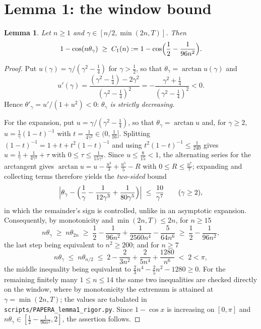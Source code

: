 \documentclass[11pt]{article}
\newtheorem{lemma}[theorem]{Lemma}
\theoremstyle{remark}
\begin{document}
\section{Lemma 1: the window bound}
\begin{lemma}\label{lem:window}
Let $n\ge1$ and $\gamma\in[n/2,\min(2n,T)]$. Then
\begin{equation}\label{eq:C1}
  1-\cos(n\theta_\gamma)\;\ge\;C_1(n):=1-\cos\Bigl(\frac12-\frac{1}{96n^{2}}\Bigr).
\end{equation}
\end{lemma}
\begin{proof}
Put $u(\gamma)=\gamma/(\gamma^{2}-\tfrac14)$ for $\gamma>\tfrac12$, so that
$\theta_\gamma=\arctan u(\gamma)$ and
\[
  u'(\gamma)=\frac{(\gamma^{2}-\tfrac14)-2\gamma^{2}}{(\gamma^{2}-\tfrac14)^{2}}
          =-\frac{\gamma^{2}+\tfrac14}{(\gamma^{2}-\tfrac14)^{2}}<0 .
\]
Hence $\theta'_\gamma=u'/(1+u^{2})<0$: \emph{$\theta_\gamma$ is strictly decreasing}.

For the expansion, put $u=\gamma/(\gamma^{2}-\tfrac14)$, so that $\theta_\gamma=\arctan u$ and, for
$\gamma\ge2$, $u=\frac1\gamma(1-t)^{-1}$ with $t=\frac1{4\gamma^{2}}\in(0,\frac1{16}]$. Splitting
$(1-t)^{-1}=1+t+t^{2}(1-t)^{-1}$ and using $t^{2}(1-t)^{-1}\le\frac1{240}$ gives
$u=\frac1\gamma+\frac1{4\gamma^{3}}+\tau$ with $0\le\tau\le\frac1{15\gamma^{5}}$. Since $u\le\frac{8}{15}<1$,
the alternating series for the arctangent gives $\arctan u=u-\frac{u^{3}}{3}+\frac{u^{5}}{5}-R$ with
$0\le R\le\frac{u^{7}}{7}$; expanding and collecting terms therefore yields the \emph{two-sided} bound
\begin{equation}\label{eq:exp}
  \Bigl|\theta_\gamma-\Bigl(\frac1\gamma-\frac{1}{12\gamma^{3}}+\frac{1}{80\gamma^{5}}\Bigr)\Bigr|
  \;\le\;\frac{10}{\gamma^{7}}\qquad(\gamma\ge2),
\end{equation}
in which the remainder's sign is controlled, unlike in an asymptotic expansion.
Consequently, by monotonicity and $\min(2n,T)\le 2n$, for $n\ge15$
\[
  n\theta_\gamma\;\ge\;n\theta_{2n}\;\ge\;\frac12-\frac{1}{96n^{2}}+\frac{1}{2560n^{4}}-\frac{5}{64n^{6}}
  \;\ge\;\frac12-\frac{1}{96n^{2}},
\]
the last step being equivalent to $n^{2}\ge200$; and for $n\ge7$
\[
  n\theta_\gamma\;\le\;n\theta_{n/2}\;\le\;2-\frac{2}{3n^{2}}+\frac{2}{5n^{4}}+\frac{1280}{n^{6}}
  \;<\;2<\pi,
\]
the middle inequality being equivalent to $\tfrac23n^{4}-\tfrac25n^{2}-1280\ge0$. For the remaining
finitely many $1\le n\le14$ the same two inequalities are checked directly on the window, where by
monotonicity the extremum is attained at $\gamma=\min(2n,T)$; the values are tabulated in
\texttt{scripts/PAPERA\_lemma1\_rigor.py}. Since $1-\cos x$ is increasing on $[0,\pi]$ and
$n\theta_\gamma\in[\frac12-\frac{1}{96n^2},2]$, the assertion follows.
\end{proof}
\end{document}

